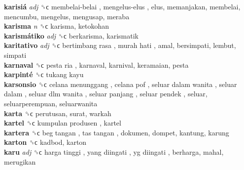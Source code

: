\textbf{karisiá} \emph{adj}  ␝ϲ   membelai-belai ,  mengelus-elus , elus, memanjakan, membelai, mencumbu, mengelus, mengusap, meraba  \\
\textbf{karisma} \emph{n}  ␝ϲ  karisma, ketokohan  \\
\textbf{karismátiko} \emph{adj}  ␝ϲ  berkarisma, karismatik  \\
\textbf{karitativo} \emph{adj}  ␝ϲ   bertimbang rasa ,  murah hati , amal, bersimpati, lembut, simpati  \\
\textbf{karnaval} ␝ϲ   pesta ria , karnaval, karnival, keramaian, pesta  \\
\textbf{karpinté} ␝ϲ   tukang kayu   \\
\textbf{karsonsio} ␝ϲ   celana menunggang ,  celana pof ,  seluar dalam wanita ,  seluar dalam ,  seluar dlm wanita ,  seluar panjang ,  seluar pendek , seluar, seluarperempuan, seluarwanita  \\
\textbf{karta} ␝ϲ  perutusan, surat, warkah  \\
\textbf{kartel} ␝ϲ   kumpulan produsen , kartel  \\
\textbf{kartera} ␝ϲ   beg tangan ,  tas tangan , dokumen, dompet, kantung, karung  \\
\textbf{karton} ␝ϲ  kadbod, karton  \\
\textbf{karu} \emph{adj}  ␝ϲ   harga tinggi ,  yang diingati ,  yg diingati , berharga, mahal, merugikan  \\
